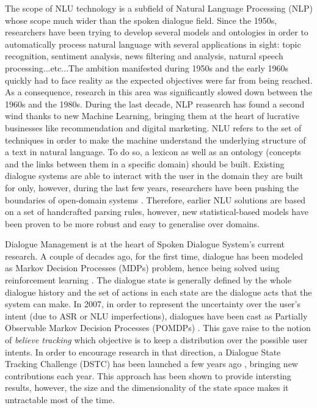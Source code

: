 		The scope of NLU technology is a subfield of Natural Language Processing (NLP) whose scope much wider than the spoken dialogue field. Since the 1950s, researchers have been trying to develop several models and ontologies in order to automatically process natural language with several applications in sight: topic recognition, sentiment analysis, news filtering and analysis, natural speech processing...etc...The ambition manifested during 1950s and the early 1960s quickly had to face reality as the expected objectives were far from being reached. As a consequence, research in this area was significantly slowed down between the 1960s and the 1980s. During the last decade, NLP reasearch has found a second wind thanks to new Machine Learning, bringing them at the heart of lucrative businesses like recommendation and digital marketing. NLU refers to the set of techniques in order to make the machine understand the underlying structure of a text in natural language. To do so, a lexicon as well as an ontology (concepts and the links between them in a specific domain) should be built. Existing dialogue systems are able to interact with the user in the domain they are built for only, however, during the last few years, researchers have been pushing the boundaries of open-domain systems \cite{Gasic2013}. Therefore, earlier NLU solutions are based on a set of handcrafted parsing rules, however, new statistical-based models have been proven to be more robust and easy to generalise over domains.

		Dialogue Management is at the heart of Spoken Dialogue System's current research. A couple of decades ago, for the first time, dialogue has been modeled as Markov Decision Processes (MDPs) problem, hence being solved using reinforcement learning \cite{Eckert1997}. The dialogue state is generally defined by the whole dialogue history and the set of actions in each state are the dialogue acts that the system can make. In 2007, in order to represent the uncertainty over the user's intent (due to ASR or NLU imperfections), dialogues have been cast as Partially Observable Markov Decision Processes (POMDPs) \cite{Williams2007}. This gave raise to the notion of \textit{believe tracking} which objective is to keep a distribution over the possible user intents. In order to encourage research in that direction, a Dialogue State Tracking Challenge (DSTC) has been launched a few years ago \cite{Williams2012b}, bringing new contributions each year. This approach has been shown to provide intersting results, however, the size and the dimensionality of the state space makes it untractable most of the time.

